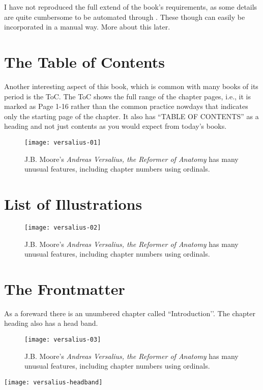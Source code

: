 I have not reproduced the full extend of the book’s requirements, as some details are quite cumbersome to be automated through \tex. These though can easily be incorporated in a manual way. More about this later.


\section{The Table of Contents}
Another interesting aspect of this book, which is common with many books of its period is the ToC. The ToC shows the full range of the chapter pages, i.e., it is marked as Page 1-16 rather than the common practice nowdays that indicates only the starting page of the chapter. It also has “TABLE OF CONTENTS”  as a heading and not just contents as you would expect from today’s books.

\begin{figure}[ht]
\centering
\texttt{[image: versalius-01]}
\caption{J.B. Moore’s \emph{Andreas Versalius, the Reformer of Anatomy} has many unusual features, including chapter numbers using ordinals. }
\end{figure}

\section{List of Illustrations}

\begin{figure}[ht]
\centering
\texttt{[image: versalius-02]}
\caption{J.B. Moore’s \emph{Andreas Versalius, the Reformer of Anatomy} has many unusual features, including chapter numbers using ordinals. }
\end{figure}

\section{The Frontmatter}
As a foreward there is an unumbered chapter called ``Introduction’’. The chapter heading also has a head band.
\begin{figure}[ht]
\centering
\texttt{[image: versalius-03]}
\caption{J.B. Moore’s \emph{Andreas Versalius, the Reformer of Anatomy} has many unusual features, including chapter numbers using ordinals. }
\label{lettrine}
\end{figure}

\bgroup
\centering
\texttt{[image: versalius-headband]}

